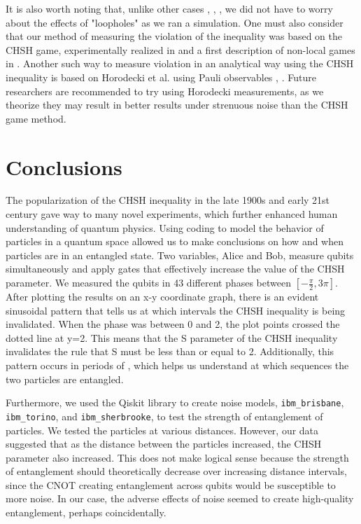 \documentclass[a4paper, onecolumn, 11pt, titlepage]{quantumarticle}
\begin{document}
It is also worth noting that, unlike other cases \cite{storz2023loophole}, \cite{steinacker2025bell}, \cite{Zhong_2019}, we did not have to worry about the effects of "loopholes" as we ran a simulation. One must also consider that our method of measuring the violation of the inequality was based on the CHSH game, experimentally realized in \cite{PhysRevLett.49.91} and a first description of non-local games in \cite{cleve2010consequenceslimitsnonlocalstrategies}. Another such way to measure violation in an analytical way using the CHSH inequality is based on Horodecki et al. \cite{HORODECKI1995340, HORODECKI1996223} using Pauli observables \cite{PhysRevA.88.052105}, \cite{Kalaga_2024}. Future researchers are recommended to try using Horodecki measurements, as we theorize they may result in better results under strenuous noise than the CHSH game method.

\section{Conclusions}

The popularization of the CHSH inequality in the late 1900s and early 21st century gave way to many novel experiments, which further enhanced human understanding of quantum physics. Using coding to model the behavior of particles in a quantum space allowed us to make conclusions on how and when particles are in an entangled state. Two variables, Alice and Bob, measure qubits simultaneously and apply gates that effectively increase the value of the CHSH parameter. We measured the qubits in 43 different phases between $[-\frac\pi2, 3\pi]$. After plotting the results on an x-y coordinate graph, there is an evident sinusoidal pattern that tells us at which intervals the CHSH inequality is being invalidated. When the phase was between 0 and 2, the plot points crossed the dotted line at y=2. This means that the S parameter of the CHSH inequality invalidates the rule that S must be less than or equal to 2. Additionally, this pattern occurs in periods of , which helps us understand at which sequences the two particles are entangled. 

Furthermore, we used the Qiskit library to create noise models, \verb|ibm_brisbane|, \verb|ibm_torino|, and \verb|ibm_sherbrooke|, to test the strength of entanglement of particles. We tested the particles at various distances. However, our data suggested that as the distance between the particles increased, the CHSH parameter also increased. This does not make logical sense because the strength of entanglement should theoretically decrease over increasing distance intervals, since the CNOT creating entanglement across qubits would be susceptible to more noise. In our case, the adverse effects of noise seemed to create high-quality entanglement, perhaps coincidentally. 
\end{document}
